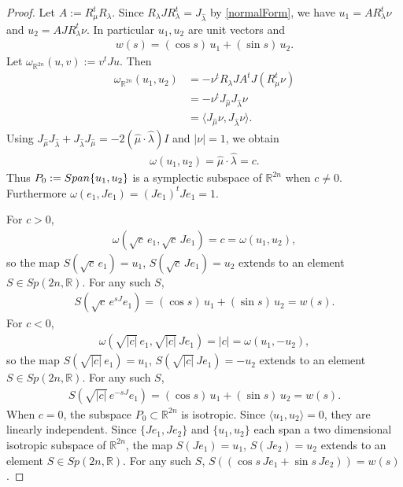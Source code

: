 \documentclass[11pt]{amsart}
\theoremstyle{plain}
\theoremstyle{definition}
\theoremstyle{remark}
\numberwithin{equation}{section}
\def\R{{\mathbb R}}%
\numberwithin{equation}{section}
\begin{document}
\begin{proof}
    Let $A:=R_\mu^tR_\lambda$. Since $R_\lambda JR_\lambda^t=J_{\hat{\lambda}}$ by \eqref{normalForm}, we have $u_1=AR_\lambda^t\nu$ and $u_2=AJR_\lambda^t\nu$. In particular $u_1, u_2$ are unit vectors and
    \begin{align*}
        w(s)=(\cos{s})\, u_1+(\sin s)\, u_2.
    \end{align*}
    Let $\omega_{\R^{2n}}(u, v):=v^tJu$. Then
    \begin{align*}
        \omega_{\R^{2n}}(u_1, u_2)
        &=-\nu^tR_\lambda J A^tJ(R_\mu^t\nu)\\
        &=-\nu^t J_{\hat\mu} J_{\hat\lambda} \nu\\
        &=\langle J_{\hat\mu} \nu, J_{\hat\lambda} \nu\rangle.
    \end{align*}
    Using $J_{\hat\mu} J_{\hat\lambda}+J_{\hat\lambda} J_{\hat\mu}=-2(\hat{\mu} \cdot \hat{\lambda}) I$ and $|\nu|=1$, we obtain
    \begin{align*}
        \omega(u_1, u_2)=\hat{\mu}\cdot \hat{\lambda}=c.
    \end{align*}
    Thus $P_0:={\rm Span}\{ u_1, u_2\}$ is a symplectic subspace of $\R^{2n}$ when $c\neq 0$. Furthermore $\omega(e_1, Je_1)=(Je_1)^tJe_1=1$.

    For $c>0$,
    \begin{align*}
        \omega(\sqrt{c}\, e_1, \sqrt{c}\, Je_1)=c=\omega(u_1, u_2),
    \end{align*}
    so the map $S(\sqrt{c}\, e_1)=u_1$, $S(\sqrt{c}\, Je_1)=u_2$ extends to an element $S\in Sp(2n, \R)$. For any such $S$,
    \begin{align*}
        S\left(\sqrt{c}\, e^{sJ}e_1\right)=(\cos s)\, u_1+(\sin s)\, u_2=w(s).
    \end{align*}
    For $c<0$,
    \begin{align*}
        \omega(\sqrt{|c|}\, e_1, \sqrt{|c|}\, Je_1)=|c|=\omega(u_1, -u_2),
    \end{align*}
    so the map $S(\sqrt{|c|}\, e_1)=u_1$, $S(\sqrt{|c|}\, Je_1)=-u_2$ extends to an element $S\in Sp(2n, \R)$. For any such $S$,
    \begin{align*}
        S\left(\sqrt{|c|}\, e^{-sJ}e_1\right)=(\cos s)\, u_1+(\sin s)\, u_2=w(s).
    \end{align*}
    When $c=0$, the subspace $P_0\subset \R^{2n}$ is isotropic. Since $\langle u_1, u_2\rangle=0$, they are linearly independent. Since $\{Je_1, Je_2\}$ and $\{u_1, u_2\}$ each span a two dimensional isotropic subspace of $\R^{2n}$, the map $S(Je_1)=u_1$, $S(Je_2)=u_2$ extends to an element $S\in Sp(2n, \R)$. For any such $S$, $S((\cos s\, Je_1+\sin s\, Je_2))=w(s)$.
\end{proof}
\end{document}
